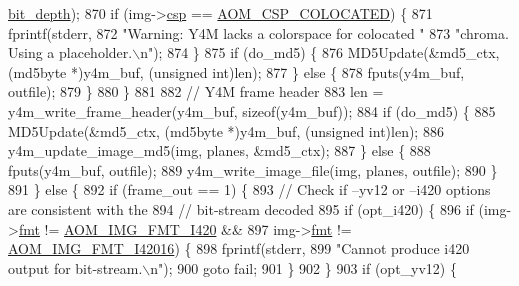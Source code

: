\begin{DoxyCodeInclude}
{{{{{{{{{{{{{{{{{{{{{{{{{{{{{{{{{{{{{{{{{{{{{{      \hyperlink{structaom__image_a46ed9ffd741938d306a0db5a24bdcf8e}{bit\_depth});
870               \textcolor{keywordflow}{if} (img->\hyperlink{structaom__image_a4f235c521bc95a061e9e0b2a3d5d457e}{csp} == \hyperlink{aom__image_8h_a10590253ef3dbde7e93ed5d4b4e0e73ba01ef7204c2234ef43acfd493d5e18c84}{AOM\_CSP\_COLOCATED}) \{
871                 fprintf(stderr,
872                         \textcolor{stringliteral}{"Warning: Y4M lacks a colorspace for colocated "}
873                         \textcolor{stringliteral}{"chroma. Using a placeholder.\(\backslash\)n"});
874               \}
875               \textcolor{keywordflow}{if} (do\_md5) \{
876                 MD5Update(&md5\_ctx, (md5byte *)y4m\_buf, (\textcolor{keywordtype}{unsigned} \textcolor{keywordtype}{int})len);
877               \} \textcolor{keywordflow}{else} \{
878                 fputs(y4m\_buf, outfile);
879               \}
880             \}
881 
882             \textcolor{comment}{// Y4M frame header}
883             len = y4m\_write\_frame\_header(y4m\_buf, \textcolor{keyword}{sizeof}(y4m\_buf));
884             \textcolor{keywordflow}{if} (do\_md5) \{
885               MD5Update(&md5\_ctx, (md5byte *)y4m\_buf, (\textcolor{keywordtype}{unsigned} \textcolor{keywordtype}{int})len);
886               y4m\_update\_image\_md5(img, planes, &md5\_ctx);
887             \} \textcolor{keywordflow}{else} \{
888               fputs(y4m\_buf, outfile);
889               y4m\_write\_image\_file(img, planes, outfile);
890             \}
891           \} \textcolor{keywordflow}{else} \{
892             \textcolor{keywordflow}{if} (frame\_out == 1) \{
893               \textcolor{comment}{// Check if --yv12 or --i420 options are consistent with the}
894               \textcolor{comment}{// bit-stream decoded}
895               \textcolor{keywordflow}{if} (opt\_i420) \{
896                 \textcolor{keywordflow}{if} (img->\hyperlink{structaom__image_a6c64b1ab918d80d52eb8f5d6d957e825}{fmt} != \hyperlink{aom__image_8h_a930317c04b4bd0a660bb5e744055523cabd778a3d697463e89d12a1117f417b60}{AOM\_IMG\_FMT\_I420} &&
897                     img->\hyperlink{structaom__image_a6c64b1ab918d80d52eb8f5d6d957e825}{fmt} != \hyperlink{aom__image_8h_a930317c04b4bd0a660bb5e744055523ca20a9cf30277260685642b4cfb4e9273b}{AOM\_IMG\_FMT\_I42016}) \{
898                   fprintf(stderr,
899                           \textcolor{stringliteral}{"Cannot produce i420 output for bit-stream.\(\backslash\)n"});
900                   \textcolor{keywordflow}{goto} fail;
901                 \}
902               \}
903               \textcolor{keywordflow}{if} (opt\_yv12) \{
}}}}}}}}}}}}}}}}}}}}}}}}}}}}}}}}}}}}}}}}}}}}}}
\end{DoxyCodeInclude}
